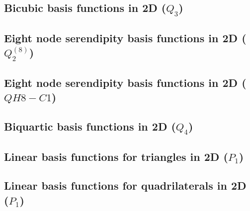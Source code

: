 \subsection{Bicubic basis functions in 2D ($Q_3$) \label{ss:q32d}}



\subsection{Eight node serendipity basis functions in 2D ($Q_2^{(8)}$)}
\label{sec:serendipity2D}



\subsection{Eight node serendipity basis functions in 2D ($QH8-C1$)}
\label{sec:serendipity2Db}
 



\subsection{Biquartic basis functions in 2D ($Q_4$) \label{ss:q42d}}



\subsection{Linear basis functions for triangles in 2D ($P_1$)}\label{ss:p1}



\subsection{Linear basis functions for quadrilaterals in 2D ($P_1$)}\label{ss:lbfq2D}



